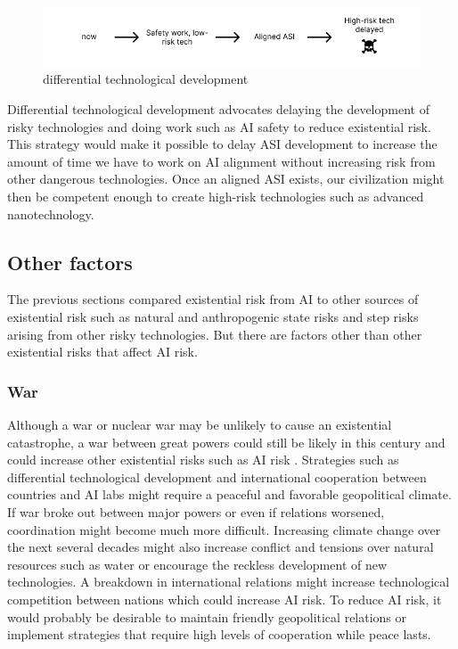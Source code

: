 \documentclass{article}
\begin{document}
\begin{figure}[h]
\includegraphics[width=12cm]{differential-technological-development}
\centering
\caption{differential technological development}
\end{figure}

Differential technological development advocates delaying the development of risky technologies and doing work such as AI safety to reduce existential risk. This strategy would make it possible to delay ASI development to increase the amount of time we have to work on AI alignment without increasing risk from other dangerous technologies. Once an aligned ASI exists, our civilization might then be competent enough to create high-risk technologies such as advanced nanotechnology.

\subsection{Other factors}

The previous sections compared existential risk from AI to other sources of existential risk such as natural and anthropogenic state risks and step risks arising from other risky technologies. But there are factors other than other existential risks that affect AI risk.

\subsubsection{War}

Although a war or nuclear war may be unlikely to cause an existential catastrophe, a war between great powers could still be likely in this century and could increase other existential risks such as AI risk \cite{theprecipice}. Strategies such as differential technological development and international cooperation between countries and AI labs might require a peaceful and favorable geopolitical climate. If war broke out between major powers or even if relations worsened, coordination might become much more difficult. Increasing climate change over the next several decades might also increase conflict and tensions over natural resources such as water or encourage the reckless development of new technologies. A breakdown in international relations might increase technological competition between nations which could increase AI risk. To reduce AI risk, it would probably be desirable to maintain friendly geopolitical relations or implement strategies that require high levels of cooperation while peace lasts.
\end{document}
